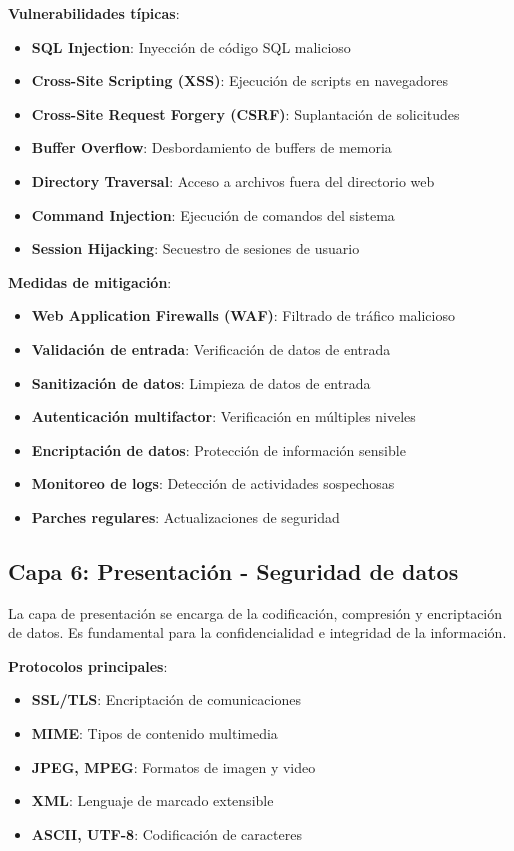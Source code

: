 \textbf{Vulnerabilidades típicas}:
\begin{itemize}
    \item \textbf{SQL Injection}: Inyección de código SQL malicioso
    \item \textbf{Cross-Site Scripting (XSS)}: Ejecución de scripts en navegadores
    \item \textbf{Cross-Site Request Forgery (CSRF)}: Suplantación de solicitudes
    \item \textbf{Buffer Overflow}: Desbordamiento de buffers de memoria
    \item \textbf{Directory Traversal}: Acceso a archivos fuera del directorio web
    \item \textbf{Command Injection}: Ejecución de comandos del sistema
    \item \textbf{Session Hijacking}: Secuestro de sesiones de usuario
\end{itemize}

\textbf{Medidas de mitigación}:
    \begin{itemize}
    \item \textbf{Web Application Firewalls (WAF)}: Filtrado de tráfico malicioso
    \item \textbf{Validación de entrada}: Verificación de datos de entrada
    \item \textbf{Sanitización de datos}: Limpieza de datos de entrada
    \item \textbf{Autenticación multifactor}: Verificación en múltiples niveles
    \item \textbf{Encriptación de datos}: Protección de información sensible
    \item \textbf{Monitoreo de logs}: Detección de actividades sospechosas
    \item \textbf{Parches regulares}: Actualizaciones de seguridad
\end{itemize}

\subsection{Capa 6: Presentación - Seguridad de datos}

La capa de presentación se encarga de la codificación, compresión y encriptación de datos. Es fundamental para la confidencialidad e integridad de la información.

\textbf{Protocolos principales}:
\begin{itemize}
    \item \textbf{SSL/TLS}: Encriptación de comunicaciones
    \item \textbf{MIME}: Tipos de contenido multimedia
    \item \textbf{JPEG, MPEG}: Formatos de imagen y video
    \item \textbf{XML}: Lenguaje de marcado extensible
    \item \textbf{ASCII, UTF-8}: Codificación de caracteres
\end{itemize}

